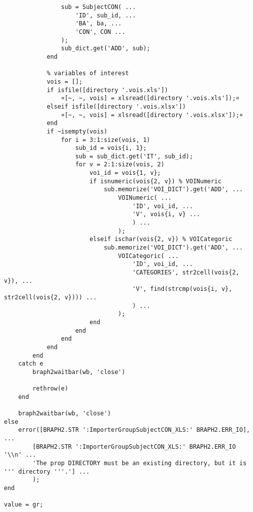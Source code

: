 \documentclass{tufte-handout}
\begin{document}
\begin{lstlisting}
                sub = SubjectCON( ...
                    'ID', sub_id, ...
                    'BA', ba, ...
                    'CON', CON ...
                );
                sub_dict.get('ADD', sub);
            end
            
            % variables of interest
            vois = [];
            if isfile([directory '.vois.xls'])
                ¤[~, ~, vois] = xlsread([directory '.vois.xls']);¤
            elseif isfile([directory '.vois.xlsx'])
                ¤[~, ~, vois] = xlsread([directory '.vois.xlsx']);¤
            end
            if ~isempty(vois)
                for i = 3:1:size(vois, 1)
                    sub_id = vois{i, 1};
                    sub = sub_dict.get('IT', sub_id);
                    for v = 2:1:size(vois, 2)
                        voi_id = vois{1, v};
                        if isnumeric(vois{2, v}) % VOINumeric
                            sub.memorize('VOI_DICT').get('ADD', ...
                                VOINumeric( ...
                                    'ID', voi_id, ...
                                    'V', vois{i, v} ...
                                    ) ...
                                );
                        elseif ischar(vois{2, v}) % VOICategoric
                            sub.memorize('VOI_DICT').get('ADD', ...
                                VOICategoric( ...
                                    'ID', voi_id, ...
                                    'CATEGORIES', str2cell(vois{2, v}), ...
                                    'V', find(strcmp(vois{i, v}, str2cell(vois{2, v}))) ...
                                    ) ...
                                );
                        end                        
                    end
                end
            end
        end
    catch e
        braph2waitbar(wb, 'close')
        
        rethrow(e)
    end
    
    braph2waitbar(wb, 'close')
else
    error([BRAPH2.STR ':ImporterGroupSubjectCON_XLS:' BRAPH2.ERR_IO], ...
        [BRAPH2.STR ':ImporterGroupSubjectCON_XLS:' BRAPH2.ERR_IO '\\n' ...
        'The prop DIRECTORY must be an existing directory, but it is ''' directory '''.'] ...
        );
end

value = gr;

\end{lstlisting}
\end{document}
